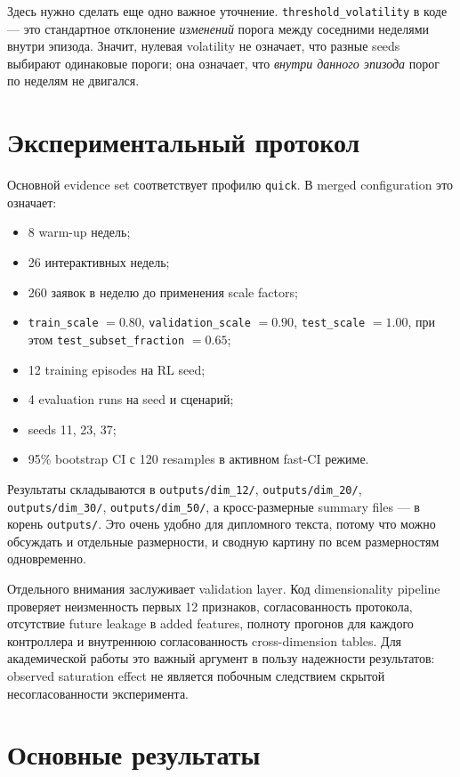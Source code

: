 \documentclass[12pt,a4paper]{article}
\begin{document}
Здесь нужно сделать еще одно важное уточнение. \texttt{threshold\_volatility} в коде --- это стандартное отклонение \emph{изменений} порога между соседними неделями внутри эпизода. Значит, нулевая volatility не означает, что разные seeds выбирают одинаковые пороги; она означает, что \emph{внутри данного эпизода} порог по неделям не двигался.

\section{Экспериментальный протокол}

Основной evidence set соответствует профилю \texttt{quick}. В merged configuration это означает:
\begin{itemize}[leftmargin=*]
    \item 8 warm-up недель;
    \item 26 интерактивных недель;
    \item 260 заявок в неделю до применения scale factors;
    \item \texttt{train\_scale} $= 0.80$, \texttt{validation\_scale} $= 0.90$, \texttt{test\_scale} $= 1.00$, при этом \texttt{test\_subset\_fraction} $= 0.65$;
    \item 12 training episodes на RL seed;
    \item 4 evaluation runs на seed и сценарий;
    \item seeds 11, 23, 37;
    \item 95\% bootstrap CI с 120 resamples в активном fast-CI режиме.
\end{itemize}

Результаты складываются в \texttt{outputs/dim\_12/}, \texttt{outputs/dim\_20/}, \texttt{outputs/dim\_30/}, \texttt{outputs/dim\_50/}, а кросс-размерные summary files --- в корень \texttt{outputs/}. Это очень удобно для дипломного текста, потому что можно обсуждать и отдельные размерности, и сводную картину по всем размерностям одновременно.

Отдельного внимания заслуживает validation layer. Код dimensionality pipeline проверяет неизменность первых 12 признаков, согласованность протокола, отсутствие future leakage в added features, полноту прогонов для каждого контроллера и внутреннюю согласованность cross-dimension tables. Для академической работы это важный аргумент в пользу надежности результатов: observed saturation effect не является побочным следствием скрытой несогласованности эксперимента.

\section{Основные результаты}
\end{document}
